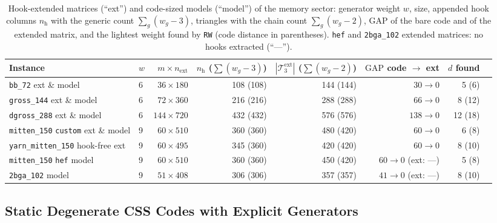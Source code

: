 \documentclass[12pt]{article}
\theoremstyle{definition}
\newcommand{\Tc}{\mathcal{T}_3}
\newcommand{\ttt}[1]{\texttt{#1}}
\begin{document}
\begin{table}[htbp]
\centering
\caption{Hook-extended matrices (``ext'') and code-sized models (``model'') of the memory sector: generator weight
$w$, size, appended hook columns $n_{\mathrm{h}}$ with the generic count $\sum_g (w_g - 3)$, triangles with the chain
count $\sum_g (w_g - 2)$, $\mathrm{GAP}$ of the bare code and of the extended matrix, and the lightest weight found
by \ttt{RW} (code distance in parentheses). \ttt{hef} and \ttt{2bga\_102} extended matrices: no hooks extracted
(``---'').}\label{tab:ext_css}
\smallskip
\scriptsize
\setlength{\tabcolsep}{3.5pt}
\begin{tabular}{@{}llrrrrrr@{}}
\toprule
Instance & $w$ & $m \times n_{\mathrm{ext}}$ & $n_{\mathrm{h}}$ ($\sum (w_g - 3)$) & $|\Tc^{\mathrm{ext}}|$ ($\sum
  (w_g - 2)$) & $\mathrm{GAP}$ code $\to$ ext & $d$ found \\
\midrule
\ttt{bb\_72} ext \& model & 6 & $36 \times 180$ & 108 (108) & 144 (144) & $30 \to 0$ & 5 (6) \\
\ttt{gross\_144} ext \& model & 6 & $72 \times 360$ & 216 (216) & 288 (288) & $66 \to 0$ & 8 (12) \\
\ttt{dgross\_288} ext \& model & 6 & $144 \times 720$ & 432 (432) & 576 (576) & $138 \to 0$ & 12 (18) \\
\ttt{mitten\_150} \ttt{custom} ext \& model & 9 & $60 \times 510$ & 360 (360) & 480 (420) & $60 \to 0$ & 6 (8) \\
\ttt{yarn\_mitten\_150} hook-free ext & 9 & $60 \times 495$ & 345 (360) & 420 (420) & $60 \to 0$ & 8 (10) \\
\ttt{mitten\_150} \ttt{hef} model & 9 & $60 \times 510$ & 360 (360) & 450 (420) & $60 \to 0$ (ext: ---) & 5 (8) \\
\ttt{2bga\_102} model & 9 & $51 \times 408$ & 306 (306) & 357 (357) & $41 \to 0$ (ext: ---) & 8 (10) \\
\bottomrule
\end{tabular}
\end{table}

\subsection{Static Degenerate CSS Codes with Explicit Generators}\label{subsec:static_css}
\end{document}
